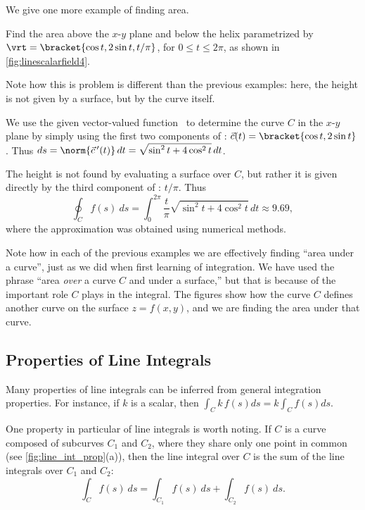 We give one more example of finding area.


{Find the area above the $x$-$y$ plane and below the helix parametrized by $\vrt =\bracket{\cos t,2\sin t,t/\pi}$, for $0\leq t\leq 2\pi$, as shown in \autoref{fig:linescalarfield4}.}
{Note how this is problem is different than the previous examples: here, the height is not given by a surface, but by the curve itself. 

We use the given vector-valued function \vrt\ to determine the curve $C$ in the $x$-$y$ plane by simply using the first two components of \vrt: $\vec c(t) =\bracket{\cos t,2\sin t}$. Thus $ds = \norm{\vec c\,'(t)}\,dt = \sqrt{\sin^2t + 4\cos^2t}\,dt$. 

The height is not found by evaluating a surface over $C$, but rather it is given directly by the third component of \vrt: $t/\pi$. Thus
\[
\oint_C f(s)\ ds
= \int_0^{2\pi} \frac{t}{\pi}\sqrt{\sin^2t + 4\cos^2t}\,dt \approx 9.69,
\]
where the approximation was obtained using numerical methods.}

Note how in each of the previous examples we are effectively finding ``area under a curve'', just as we did when first learning of integration. We have used the phrase ``area \emph{over} a curve $C$ and under a surface,'' but that is because of the important role $C$ plays in the integral. The figures show how the curve $C$ defines another curve on the surface $z=f(x,y)$, and we are finding the area under that curve.

\subsection{Properties of Line Integrals}

Many properties of line integrals can be inferred from general integration properties. For instance, if $k$ is a scalar, then $\int_C k\,f(s)ds = k\int_Cf(s)ds$.

One property in particular of line integrals is worth noting. If $C$ is a curve composed of subcurves $C_1$ and $C_2$, where they share only one point in common (see \autoref{fig:line_int_prop}(a)), then the line integral over $C$ is the sum of the line integrals over $C_1$ and $C_2$: 
\[\int_Cf(s)\ ds = \int_{C_1}f(s)\ ds+\int_{C_2}f(s)\ ds.\]

